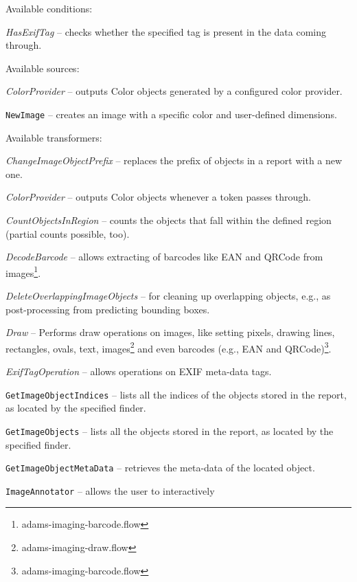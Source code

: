 \documentclass[a4paper]{book}
\begin{document}
\noindent Available conditions:
\begin{tight_itemize}
  \item \textit{HasExifTag} -- checks whether the specified tag is present in
  the data coming through.
\end{tight_itemize}

\noindent Available sources:
\begin{tight_itemize}
  \item \textit{ColorProvider} -- outputs Color objects generated by a
  configured color provider.
  \item \texttt{NewImage} -- creates an image with a specific color and
  user-defined dimensions.
\end{tight_itemize}

\noindent Available transformers:
\begin{tight_itemize}
  \item \textit{ChangeImageObjectPrefix} -- replaces the prefix of
  objects in a report with a new one.
  \item \textit{ColorProvider} -- outputs Color objects whenever a token
  passes through.
  \item \textit{CountObjectsInRegion} -- counts the objects that fall
  within the defined region (partial counts possible, too).
  \item \textit{DecodeBarcode} -- allows extracting of barcodes like
  EAN and QRCode from images\footnote{adams-imaging-barcode.flow}.
  \item \textit{DeleteOverlappingImageObjects} -- for cleaning up
  overlapping objects, e.g., as post-processing from predicting bounding
  boxes.
  \item \textit{Draw} -- Performs draw operations on images, like setting
  pixels, drawing lines, rectangles, ovals, text, images\footnote{adams-imaging-draw.flow}
  and even barcodes (e.g., EAN and QRCode)\footnote{adams-imaging-barcode.flow}.
  \item \textit{ExifTagOperation} -- allows operations on EXIF meta-data tags.
  \item \texttt{GetImageObjectIndices} -- lists all the indices of the objects
  stored in the report, as located by the specified finder.
  \item \texttt{GetImageObjects} -- lists all the objects stored in the
  report, as located by the specified finder.
  \item \texttt{GetImageObjectMetaData} -- retrieves the meta-data of
  the located object.
  \item \texttt{ImageAnnotator} -- allows the user to interactively

\end{tight_itemize}
\end{document}
